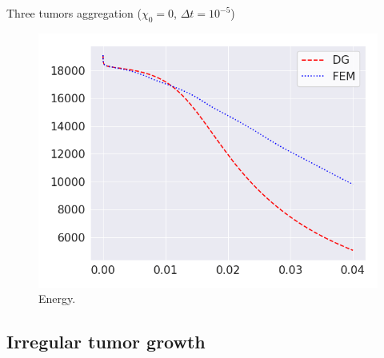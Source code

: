 \begin{frame}{Three tumors aggregation ($\chi_0=0$, $\Delta t=10^{-5}$)}
	\begin{figure}
		\centering
		\includegraphics[scale=0.45]{img/three_tumors/tumor_energy_chi-10.png}
		\caption{Energy.}
	\end{figure}
\end{frame}

\subsection{Irregular tumor growth}

